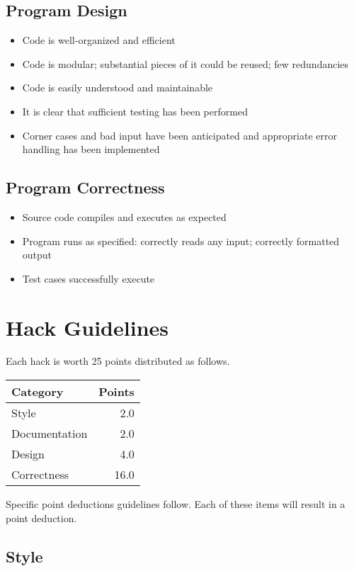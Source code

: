 \documentclass[12pt]{scrartcl}
\begin{document}
\subsection*{Program Design}
\begin{itemize}
  \item Code is well-organized and efficient
  \item Code is modular; substantial pieces of it could be reused; few redundancies
  \item Code is easily understood and maintainable
  \item It is clear that sufficient testing has been performed
  \item Corner cases and bad input have been anticipated and appropriate error handling has been implemented  
\end{itemize}

\subsection*{Program Correctness}
\begin{itemize}
  \item Source code compiles and executes as expected
  \item Program runs as specified: correctly reads any input; correctly formatted output
  \item Test cases successfully execute
\end{itemize}

\section*{Hack Guidelines}

Each hack is worth 25 points distributed as follows.
\begin{table}[h]
\centering
\begin{tabular}{|l|r|}
\hline
Category & Points \\
\hline
Style & 2.0 \\
\hline
Documentation & 2.0 \\
\hline
Design & 4.0 \\
\hline
Correctness & 16.0 \\
\hline
\end{tabular}
\end{table}

Specific point deductions guidelines follow.  Each of these 
items will result in a point deduction.

\subsection*{Style}
\end{document}
